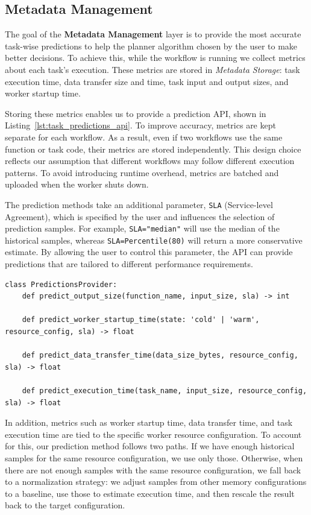 \documentclass[conference]{IEEEtran}
\begin{document}
\subsection{Metadata Management}
\label{ss:metadata_management}
The goal of the \textbf{Metadata Management} layer is to provide the most accurate task-wise predictions to help the planner algorithm chosen by the user to make better decisions. To achieve this, while the workflow is running we collect metrics about each task's execution. These metrics are stored in \textit{Metadata Storage}: task execution time, data transfer size and time, task input and output sizes, and worker startup time. 

Storing these metrics enables us to provide a prediction API, shown in Listing~\ref{lst:task_predictions_api}. To improve accuracy, metrics are kept separate for each workflow. As a result, even if two workflows use the same function or task code, their metrics are stored independently. This design choice reflects our assumption that different workflows may follow different execution patterns. To avoid introducing runtime overhead, metrics are batched and uploaded when the worker shuts down.

The prediction methods take an additional parameter, \texttt{SLA} (Service-level Agreement), which is specified by the user and influences the selection of prediction samples. For example, \texttt{SLA="median"} will use the median of the historical samples, whereas \texttt{SLA=Percentile(80)} will return a more conservative estimate. By allowing the user to control this parameter, the API can provide predictions that are tailored to different performance requirements.

\begin{lstlisting}[basicstyle=\ttfamily\footnotesize, columns=fullflexible, breaklines=true, caption=Task Predictions API, label=lst:task_predictions_api]
class PredictionsProvider:
    def predict_output_size(function_name, input_size, sla) -> int

    def predict_worker_startup_time(state: 'cold' | 'warm', resource_config, sla) -> float

    def predict_data_transfer_time(data_size_bytes, resource_config, sla) -> float

    def predict_execution_time(task_name, input_size, resource_config, sla) -> float
\end{lstlisting}
In addition, metrics such as worker startup time, data transfer time, and task execution time are tied to the specific worker resource configuration. To account for this, our prediction method follows two paths. If we have enough historical samples for the same resource configuration, we use only those. Otherwise, when there are not enough samples with the same resource configuration, we fall back to a normalization strategy: we adjust samples from other memory configurations to a baseline, use those to estimate execution time, and then rescale the result back to the target configuration. 
\end{document}
